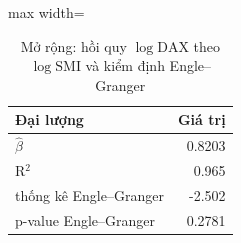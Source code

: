 \begin{table}[H]
\centering\footnotesize
\caption{Mở rộng: hồi quy $\log\mathrm{DAX}$ theo $\log\mathrm{SMI}$ và kiểm định Engle--Granger}\label{tab:tab_b12_ext_cointegration}
\begin{adjustbox}{max width=\linewidth}
\begin{tabular}{|l|r|}
\toprule
Đại lượng & Giá trị \\
\midrule
$\hat{\beta}$ & 0.8203 \\
R$^{2}$ & 0.965 \\
thống kê Engle–Granger & -2.502 \\
p-value Engle–Granger & 0.2781 \\
\bottomrule
\end{tabular}
\end{adjustbox}
\end{table}
